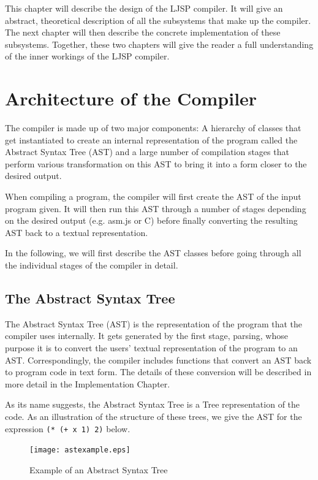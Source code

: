 \documentclass[11pt]{report}
\begin{document}
This chapter will describe the design of the LJSP compiler. It will give an abstract, theoretical description of all the subsystems that make up the compiler. The next chapter will then describe the concrete implementation of these subsystems. Together, these two chapters will give the reader a full understanding of the inner workings of the LJSP compiler.

\section{Architecture of the Compiler}
The compiler is made up of two major components: A hierarchy of classes that get instantiated to create an internal representation of the program called the Abstract Syntax Tree (AST) and a large number of compilation stages that perform various transformation on this AST to bring it into a form closer to the desired output.

When compiling a program, the compiler will first create the AST of the input program given. It will then run this AST through a number of stages depending on the desired output (e.g. asm.js or C) before finally converting the resulting AST back to a textual representation.

In the following, we will first describe the AST classes before going through all the individual stages of the compiler in detail.

\subsection{The Abstract Syntax Tree}
The Abstract Syntax Tree (AST) is the representation of the program that the compiler uses internally. It gets generated by the first stage, parsing, whose purpose it is to convert the users' textual representation of the program to an AST. Correspondingly, the compiler includes functions that convert an AST back to program code in text form. The details of these conversion will be described in more detail in the Implementation Chapter.

As its name suggests, the Abstract Syntax Tree is a Tree representation of the code. As an illustration of the structure of these trees, we give the AST for the expression \hbox{\texttt{(* (+ x 1) 2)}} below.

\begin{figure}[ht]
\begin{center}
\texttt{[image: astexample.eps]}
\end{center}
\caption{Example of an Abstract Syntax Tree}
\label{astexample}
\end{figure}
\end{document}
